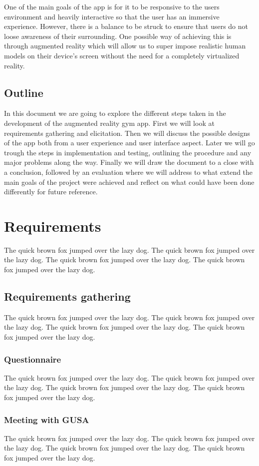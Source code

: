 \documentclass{l4proj}
\begin{document}
One of the main goals of the app is for it to be responsive to the users environment and heavily interactive so that the user has an immersive experience. However, there is a balance to be struck to ensure that users do not loose awareness of their surrounding. One possible way of achieving this is through augmented reality which will allow us to super impose realistic human models on their device's screen without the need for a completely virtualized reality.  


\section{Outline}
In this document we are going to explore the different steps taken in the development of the augmented reality gym app. First we will look at requirements gathering and elicitation. Then we will discuss the possible designs of the app both from a user experience and user interface aspect. Later we will go trough the steps in implementation and testing, outlining the procedure and any major problems along the way. Finally we will draw the document to a close with a conclusion, followed by an evaluation where we will address to what extend the main goals of the project were achieved and reflect on what could have been done differently for future reference. 

\chapter{Requirements}
The quick brown fox jumped over the lazy dog.
The quick brown fox jumped over the lazy dog.
The quick brown fox jumped over the lazy dog.
The quick brown fox jumped over the lazy dog.

\section{Requirements gathering}
The quick brown fox jumped over the lazy dog.
The quick brown fox jumped over the lazy dog.
The quick brown fox jumped over the lazy dog.
The quick brown fox jumped over the lazy dog.
\subsection{Questionnaire}
The quick brown fox jumped over the lazy dog.
The quick brown fox jumped over the lazy dog.
The quick brown fox jumped over the lazy dog.
The quick brown fox jumped over the lazy dog.
\subsection{Meeting with GUSA}
The quick brown fox jumped over the lazy dog.
The quick brown fox jumped over the lazy dog.
The quick brown fox jumped over the lazy dog.
The quick brown fox jumped over the lazy dog.
\end{document}

